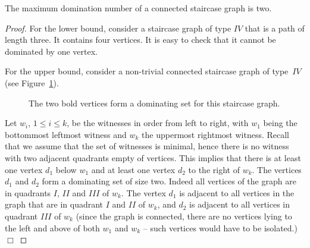 \documentclass{llncs}
\begin{document}
\begin{lemma}
\label{DominationNumberStaircase}
The maximum domination number of a connected staircase graph is two.
\end{lemma}
\begin{proof}
For the lower bound, consider a staircase graph of type $IV$ that is a path of length three. It contains four vertices.
It is easy to check that it cannot be dominated by one vertex.


For the upper bound, consider a non-trivial connected staircase graph of type~$IV$ (see Figure~\ref{DominationStaircaise2}). 
\begin{figure}
\centering
{}
\caption{The two bold vertices form a dominating set for this staircase graph.}
   \label{DominationStaircaise2}
\end{figure}
Let $w_i$, $1 \leq i \leq k$, be the witnesses in order from left to right, with $w_1$ being the bottommost leftmost witness and $w_k$ the uppermost rightmost witness.
Recall that we assume that the set of witnesses is minimal, hence there is no witness with two adjacent quadrants empty of vertices.
This implies that there is at least one vertex $d_1$ below $w_1$ and at least one vertex $d_2$ to the right of $w_k$.
The vertices $d_1$ and $d_2$ form a dominating set of size two.
Indeed all vertices of the graph are in quadrants $I$, $II$ and $III$ of $w_k$.
The vertex $d_1$ is adjacent to all vertices in the graph that are in quadrant $I$ and $II$ of $w_k$, and $d_2$ is adjacent to all vertices in quadrant $III$ of $w_k$ (since the graph is connected, there are no vertices lying to the left and above of both $w_1$ and $w_k$ -- such vertices would have to be isolated.)
 \hfill $\Box$
\end{proof}
\end{document}
